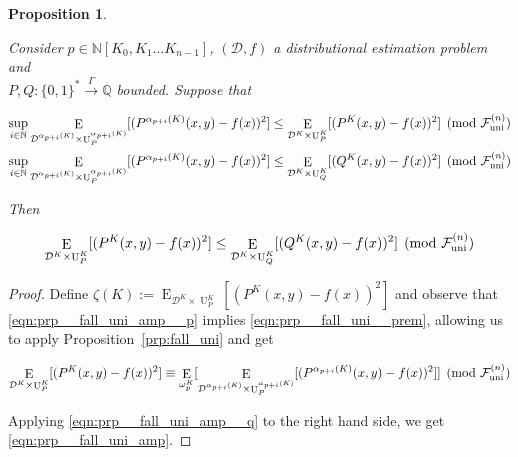 \documentclass{article}
\numberwithin{equation}{section}
\theoremstyle{definition}
\theoremstyle{plain}
\newtheorem{proposition}{Proposition}[section]
\newcommand{\Bool}{\{0,1\}}
\newcommand{\Words}{{\Bool^*}}
\DeclareMathOperator{\E}{E}
\DeclareMathOperator{\Un}{U}
\newcommand{\Nats}{\mathbb{N}}
\newcommand{\Rats}{\mathbb{Q}}
\newcommand{\NatPoly}{\Nats[K_0, K_1 \ldots K_{n-1}]}
\newcommand{\Dist}{\mathcal{D}}
\newcommand{\Fall}{\mathcal{F}}
\newcommand{\FallU}{{\Fall_{\textnormal{uni}}^{(n)}}}
\newcommand{\Scheme}{\xrightarrow{\Gamma}}
\begin{document}
\begin{samepage}
\begin{proposition}
\label{prp:fall_uni_amp}

Consider ${p \in \NatPoly}$, ${(\Dist,f)}$ a distributional estimation problem and\\ ${P,Q: \Words \Scheme \Rats}$ bounded. Suppose that

\begin{align}
\label{eqn:prp__fall_uni_amp__p}\sup_{i \in \Nats} \E_{ \Dist^{\alpha_{p+i}(K)} \times \Un_P^{\alpha_{p+i}(K)}}[(P^{\alpha_{p+i}(K)}(x,y)-f(x))^2] &\leq \E_{ \Dist^{K} \times \Un_P^{K}}[(P^{K}(x,y)-f(x))^2] \pmod \FallU \\
\label{eqn:prp__fall_uni_amp__q}\sup_{i \in \Nats} \E_{\Dist^{\alpha_{p+i}(K)} \times \Un_P^{\alpha_{p+i}(K)}}[(P^{\alpha_{p+i}(K)}(x,y)-f(x))^2] &\leq \E_{\Dist^{K} \times \Un_Q^{K}}[(Q^{K}(x,y)-f(x))^2] \pmod \FallU
\end{align}

Then

\begin{equation}
\label{eqn:prp__fall_uni_amp}
\E_{\Dist^{K} \times \Un_P^{K}}[(P^{K}(x,y)-f(x))^2] \leq \E_{\Dist^{K} \times \Un_Q^{K}}[(Q^{K}(x,y)-f(x))^2] \pmod \FallU
\end{equation}

\end{proposition}
\end{samepage}

\begin{proof}

Define ${\zeta(K):=\E_{\Dist^{K} \times \Un_P^{K}}[(P^{K}(x,y)-f(x))^2]}$ and observe that \ref{eqn:prp__fall_uni_amp__p} implies \ref{eqn:prp__fall_uni__prem}, allowing us to apply Proposition~\ref{prp:fall_uni} and get

\[\E_{\Dist^{K} \times \Un_P^{K}}[(P^{K}(x,y)-f(x))^2] \equiv \E_{\omega_p^K}[\E_{ \Dist^{\alpha_{p+i}(K)} \times \Un_P^{\alpha_{p+i}(K)}}[(P^{\alpha_{p+i}(K)}(x,y)-f(x))^2]] \pmod \FallU\]

Applying \ref{eqn:prp__fall_uni_amp__q} to the right hand side, we get \ref{eqn:prp__fall_uni_amp}.
%
\end{proof}
\end{document}
